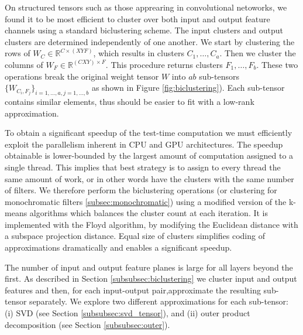 On structured tensors such as those apprearing in convolutional netoworks,
we found it to be most efficient to cluster
over both input and output feature channels using a standard biclustering scheme.
 The input clusters and output clusters are determined independently of one another. 
We start by clustering the rows of $W_C \in \mathbb{R}^{C \times (XYF)}$, which results in
clusters $C_1, \dots, C_a$. Then we cluster the columns of $W_F  \in
\mathbb{R}^{(CXY) \times F}$. This procedure returns clusters $F_1,
\dots, F_b$. These two operations break the original weight tensor $W$
into $ab$ sub-tensors $\{W_{C_i, F_j}\}_{i = 1, \dots, a, j = 1,
  \dots, b}$ as shown in Figure \ref{fig:biclustering}). Each
sub-tensor contains similar elements, thus should be easier to
fit with a low-rank approximation. 

To obtain a significant speedup of the test-time computation we must
efficiently exploit the parallelism inherent in CPU and GPU
architectures. The speedup obtainable is lower-bounded by the largest
amount of computation assigned to a single thread. This implies that
best strategy is to assign to every thread the same amount of work, or in other words
have the clusters with the same number of filters. 
We therefore perform the biclustering operations (or clustering 
for monochromatic filters \ref{subsec:monochromatic}) using a modified
version of the k-means algorithms which balances the cluster count at
each iteration. 
It is implemented with the Floyd algorithm, by modifying the Euclidean distance
with a subspace projection distance.
Equal size of clusters simplifies coding of approximations dramatically and enables a
significant speedup. 


The number of  input and output feature planes is large for all layers
beyond the first. As described in Section
\ref{subsubsec:biclustering} we cluster input and output features and then, for each input-output pair,approximate the resulting sub-tensor separately. We explore two different approximations
for each sub-tensor: (i) SVD (see Section \ref{subsubsec:svd_tensor}),
and (ii) outer product decomposition (see Section \ref{subsubsec:outer}).

